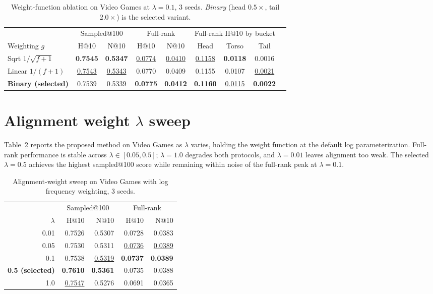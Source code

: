 \documentclass{article}
\begin{document}
\begin{table}[h]
  \centering
  \small
  \caption{Weight-function ablation on Video Games at $\lambda =
  0.1$, 3 seeds. \emph{Binary} (head $0.5\times$, tail
  $2.0\times$) is the selected variant.}
  \label{tab:app-weight}
  \setlength{\tabcolsep}{4pt}
  \begin{tabular}{lcccccccc}
    \toprule
    & \multicolumn{2}{c}{Sampled@100} & \multicolumn{2}{c}{Full-rank} & \multicolumn{3}{c}{Full-rank H@10 by bucket} \\
    \cmidrule(lr){2-3}\cmidrule(lr){4-5}\cmidrule(lr){6-8}
    Weighting $g$ & H@10 & N@10 & H@10 & N@10 & Head & Torso & Tail \\
    \midrule
    Sqrt $1/\sqrt{f{+}1}$     & \textbf{0.7545} & \textbf{0.5347} & \underline{0.0774} & \underline{0.0410} & \underline{0.1158} & \textbf{0.0118} & 0.0016 \\
    Linear $1/(f{+}1)$        & \underline{0.7543} & \underline{0.5343} & 0.0770 & 0.0409 & 0.1155 & 0.0107 & \underline{0.0021} \\
    \textbf{Binary (selected)} & 0.7539 & 0.5339 & \textbf{0.0775} & \textbf{0.0412} & \textbf{0.1160} & \underline{0.0115} & \textbf{0.0022} \\
    \bottomrule
  \end{tabular}
\end{table}

\section{Alignment weight $\lambda$ sweep}
\label{app:lambda-sweep}

Table~\ref{tab:app-lambda} reports the proposed method on Video
Games as $\lambda$ varies, holding the weight function at the
default log parameterization. Full-rank performance is stable across
$\lambda \in [0.05, 0.5]$; $\lambda = 1.0$ degrades both protocols,
and $\lambda = 0.01$ leaves alignment too weak. The selected
$\lambda = 0.5$ achieves the highest sampled@100 score while
remaining within noise of the full-rank peak at $\lambda = 0.1$.

\begin{table}[h]
  \centering
  \small
  \caption{Alignment-weight sweep on Video Games with log
  frequency weighting, 3 seeds.}
  \label{tab:app-lambda}
  \begin{tabular}{rrrrr}
    \toprule
    & \multicolumn{2}{c}{Sampled@100} & \multicolumn{2}{c}{Full-rank} \\
    \cmidrule(lr){2-3}\cmidrule(lr){4-5}
    $\lambda$ & H@10 & N@10 & H@10 & N@10 \\
    \midrule
    0.01 & 0.7526 & 0.5307 & 0.0728 & 0.0383 \\
    0.05 & 0.7530 & 0.5311 & \underline{0.0736} & \underline{0.0389} \\
    0.1  & 0.7538 & \underline{0.5319} & \textbf{0.0737} & \textbf{0.0389} \\
    \textbf{0.5 (selected)} & \textbf{0.7610} & \textbf{0.5361} & 0.0735 & 0.0388 \\
    1.0  & \underline{0.7547} & 0.5276 & 0.0691 & 0.0365 \\
    \bottomrule
  \end{tabular}
\end{table}
\end{document}
